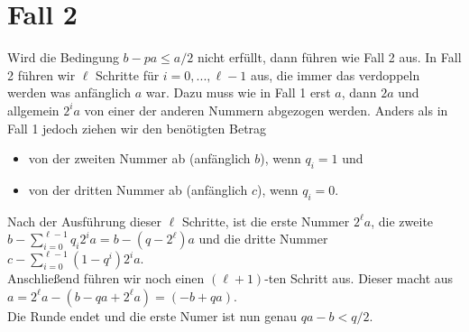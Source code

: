 \section{Fall 2} \label{case-2}
Wird die Bedingung $b-pa \leq a/2$ nicht erfüllt, dann führen wie Fall 2 aus. 
In Fall 2 führen wir $\ell$ Schritte für $i=0, ..., \ell-1$ aus, die immer das verdoppeln werden was anfänglich $a$ war. Dazu muss wie in Fall 1 erst $a$, dann $2a$ und allgemein $2^ia$ von einer der anderen Nummern abgezogen werden. 
Anders als in Fall 1 jedoch ziehen wir den benötigten Betrag 
\begin{itemize}
    \item von der zweiten Nummer ab (anfänglich $b$), wenn $q_i = 1$ und
    \item von der dritten Nummer ab (anfänglich $c$), wenn $q_i = 0$.
\end{itemize}

Nach der Ausführung dieser $\ell$ Schritte, ist die erste Nummer $2^\ell a$, die zweite $b- \sum_{i=0}^{\ell-1} q_i2^ia = b-(q-2^\ell)a$ und die dritte Nummer $c- \sum_{i=0}^{\ell-1} (1-q^i)2^ia$. \\

Anschließend führen wir noch einen $(\ell +1)$-ten Schritt aus. Dieser macht aus $a = 2^\ell a- (b-qa+2^\ell a) = (-b+qa)$. \\

Die Runde endet und die erste Numer ist nun genau $qa-b < q/2$.